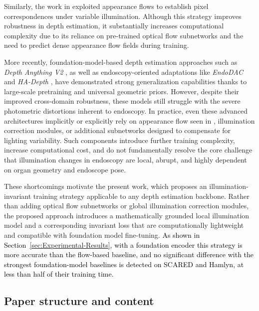 \documentclass[a4paper,fleqn]{cas-dc}
\begin{document}
Similarly, the work in \citep{Shao_MIA_2022} exploited appearance flows to establish pixel correspondences under variable illumination. Although this strategy improves robustness in depth estimation, it substantially increases computational complexity due to its reliance on pre-trained optical flow subnetworks and the need to predict dense appearance flow fields during training.

More recently, foundation-model-based depth estimation approaches such as \emph{Depth Anything V2} \citep{DepthAnythingV2_2024}, as well as endoscopy-oriented adaptations like \emph{EndoDAC} \citep{EndoDAC_MICCAI_2024} and \emph{HA-Depth} \citep{HAdepth_2025}, have demonstrated strong generalization capabilities thanks to large-scale pretraining and universal geometric priors. However, despite their improved cross-domain robustness, these models still struggle with the severe photometric distortions inherent to endoscopy. In practice, even these advanced architectures implicitly or explicitly rely on appearance flow seen in \citep{Shao_MIA_2022} , illumination correction modules, or additional subnetworks designed to compensate for lighting variability. Such components introduce further training complexity, increase computational cost, and do not fundamentally resolve the core challenge that illumination changes in endoscopy are local, abrupt, and highly dependent on organ geometry and endoscope pose.

These shortcomings motivate the present work, which proposes an illumination-invariant training strategy applicable to any depth estimation backbone. Rather than adding optical flow subnetworks or global illumination correction modules, the proposed approach introduces a mathematically grounded local illumination model and a corresponding invariant loss that are computationally lightweight and compatible with 
foundation model fine-tuning. \textcolor{black}{As shown in Section~\ref{sec:Experimental-Results}, with a foundation encoder this strategy is more accurate than the flow-based baseline, and no significant difference with the strongest foundation-model baselines is detected on SCARED and Hamlyn, at less than half of their training time.}
%
\subsection{Paper structure and content}
%
\end{document}
